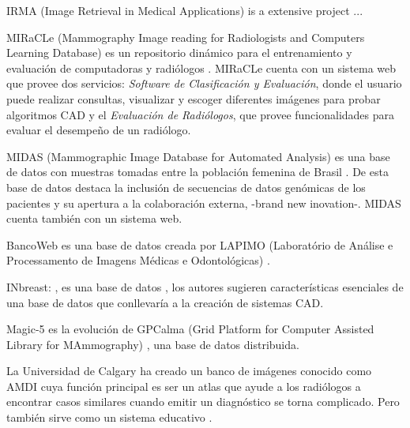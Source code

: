 IRMA (Image Retrieval in Medical Applications) is a extensive project
\cite{doi:10.1117/12.770325} ...

MIRaCLe (Mammography Image reading for Radiologists and Computers Learning
Database) es un repositorio dinámico para el entrenamiento y evaluación de
computadoras y radiólogos \cite{antoniou2009web}. MIRaCLe cuenta con un sistema
web que provee dos servicios: \textit{Software de Clasificación y Evaluación},
donde el usuario puede realizar consultas, visualizar y escoger diferentes
imágenes para probar algoritmos CAD y el \textit{Evaluación de Radiólogos}, que
provee funcionalidades para evaluar el desempeño de un radiólogo.

MIDAS (Mammographic Image Database for Automated Analysis) es una base de datos
con muestras tomadas entre la población femenina de Brasil
\cite{fernandes2012midas}. De esta base de datos destaca la inclusión de
secuencias de datos genómicas de los pacientes y su apertura a la colaboración
externa, -brand new inovation-. MIDAS cuenta también con un sistema web.

BancoWeb es una base de datos creada por LAPIMO (Laboratório de Análise e
Processamento de Imagens Médicas e Odontológicas) \cite{matheus2011online}.

INbreast: \cite{moreira2012inbreast}, es una base de datos , los autores
sugieren características esenciales de una base de datos que conllevaría a la
creación de sistemas CAD.

Magic-5 \cite{bellotti2004magic} es la evolución de GPCalma (Grid Platform for
Computer Assisted Library for MAmmography) \cite{lauria2006gpcalma}, una base
de datos distribuida. 

La Universidad de Calgary ha creado un banco de imágenes conocido como AMDI
\cite{suri2006recent} cuya función principal es ser un atlas que ayude a los
radiólogos a encontrar casos similares cuando emitir un diagnóstico se torna
complicado. Pero también sirve como un sistema educativo
\cite{guliato2009indiam}.


